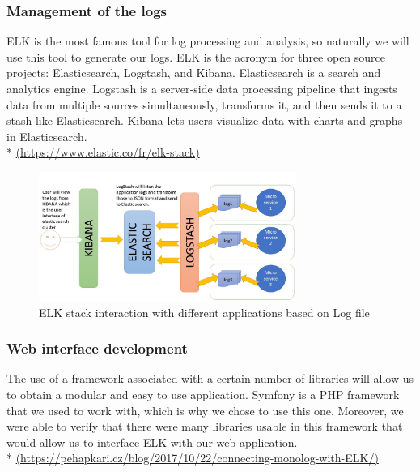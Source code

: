\pagebreak

\subsubsection{Management of the logs}

ELK is the most famous tool for log processing and analysis, so naturally we will use this tool to generate our logs.
ELK is the acronym for three open source projects:
Elasticsearch, Logstash, and Kibana. Elasticsearch is a search and
analytics engine. Logstash is a server‑side data processing pipeline
that ingests data from multiple sources simultaneously, transforms it,
and then sends it to a stash like Elasticsearch. Kibana lets
users visualize data with charts and graphs in Elasticsearch.\\ *
\url{(https://www.elastic.co/fr/elk-stack)}\\


\begin{figure}[!h]
  \centering
  \includegraphics[width=0.75\textwidth]{images/elk-example.png}
  \caption{ELK stack interaction with different applications based on Log file}
  \label{ELK}
\end{figure}

\subsubsection{Web interface development}

The use of a framework associated with a certain number of libraries will
allow us to obtain a modular and easy to use application.
Symfony is a PHP framework that we used to work with, which is why we chose
to use this one. Moreover, we were able to verify that there were many
libraries usable in this framework that would allow us to interface ELK with our web
application. \\ *
\url{(https://pehapkari.cz/blog/2017/10/22/connecting-monolog-with-ELK/)}\\

